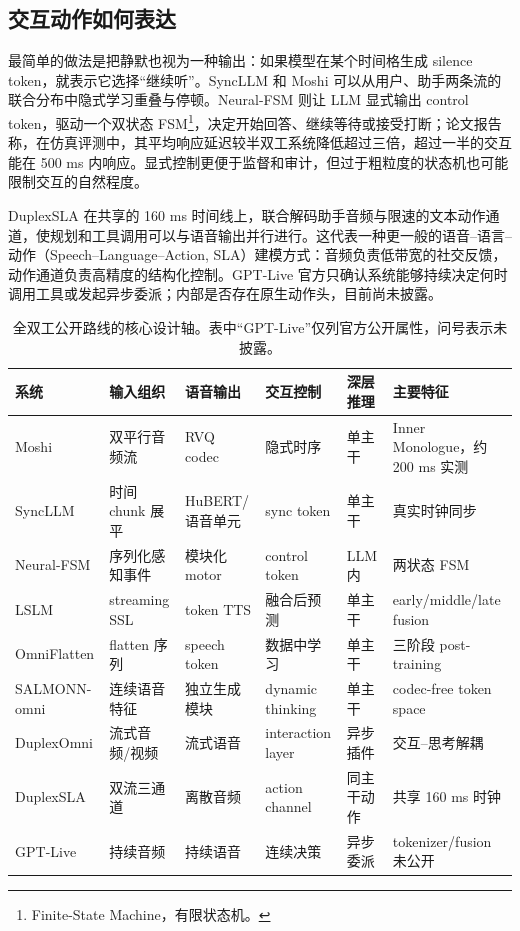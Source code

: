 \documentclass[UTF8,fontset=none,a4paper,10pt]{ctexart}
\begin{document}
\subsection{交互动作如何表达}

最简单的做法是把静默也视为一种输出：如果模型在某个时间格生成 silence token，就表示它选择“继续听”。SyncLLM 和 Moshi 可以从用户、助手两条流的联合分布中隐式学习重叠与停顿。Neural-FSM 则让 LLM 显式输出 control token，驱动一个双状态 FSM\footnote{Finite-State Machine，有限状态机。}，决定开始回答、继续等待或接受打断；论文报告称，在仿真评测中，其平均响应延迟较半双工系统降低超过三倍，超过一半的交互能在 500 ms 内响应\cite{wang2024neuralfsm}。显式控制更便于监督和审计，但过于粗粒度的状态机也可能限制交互的自然程度。

DuplexSLA 在共享的 160 ms 时间线上，联合解码助手音频与限速的文本动作通道，使规划和工具调用可以与语音输出并行进行\cite{zhang2026duplexsla}。这代表一种更一般的语音--语言--动作（Speech--Language--Action, SLA）建模方式：音频负责低带宽的社交反馈，动作通道负责高精度的结构化控制。GPT-Live 官方只确认系统能够持续决定何时调用工具或发起异步委派；内部是否存在原生动作头，目前尚未披露。

\begin{table}[H]
\centering\scriptsize
\setlength{\tabcolsep}{3pt}
\caption{全双工公开路线的核心设计轴。表中“GPT-Live”仅列官方公开属性，问号表示未披露。}
\begin{tabularx}{\textwidth}{lXXXXX}
\toprule
系统 & 输入组织 & 语音输出 & 交互控制 & 深层推理 & 主要特征 \\
\midrule
Moshi & 双平行音频流 & RVQ codec & 隐式时序 & 单主干 & Inner Monologue，约 200 ms 实测 \\
SyncLLM & 时间 chunk 展平 & HuBERT/语音单元 & sync token & 单主干 & 真实时钟同步 \\
Neural-FSM & 序列化感知事件 & 模块化 motor & control token & LLM 内 & 两状态 FSM \\
LSLM & streaming SSL & token TTS & 融合后预测 & 单主干 & early/middle/late fusion \\
OmniFlatten & flatten 序列 & speech token & 数据中学习 & 单主干 & 三阶段 post-training \\
SALMONN-omni & 连续语音特征 & 独立生成模块 & dynamic thinking & 单主干 & codec-free token space \\
DuplexOmni & 流式音频/视频 & 流式语音 & interaction layer & 异步插件 & 交互--思考解耦 \\
DuplexSLA & 双流三通道 & 离散音频 & action channel & 同主干动作 & 共享 160 ms 时钟 \\
GPT-Live & 持续音频 & 持续语音 & 连续决策 & 异步委派 & tokenizer/fusion 未公开 \\
\bottomrule
\end{tabularx}
\end{table}
\end{document}
